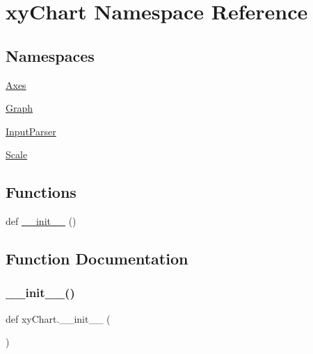 \hypertarget{namespacexy_chart}{}\section{xy\+Chart Namespace Reference}
\label{namespacexy_chart}
\subsection*{Namespaces}
\begin{DoxyCompactItemize}
\item 
 \hyperlink{namespacexy_chart_1_1_axes}{Axes}
\item 
 \hyperlink{namespacexy_chart_1_1_graph}{Graph}
\item 
 \hyperlink{namespacexy_chart_1_1_input_parser}{Input\+Parser}
\item 
 \hyperlink{namespacexy_chart_1_1_scale}{Scale}
\end{DoxyCompactItemize}
\subsection*{Functions}
\begin{DoxyCompactItemize}
\item 
def \hyperlink{namespacexy_chart_a0a9ad3e304e7b22163161e2895540585}{\+\_\+\+\_\+init\+\_\+\+\_\+} ()
\end{DoxyCompactItemize}


\subsection{Function Documentation}
\hypertarget{namespacexy_chart_a0a9ad3e304e7b22163161e2895540585}{}\label{namespacexy_chart_a0a9ad3e304e7b22163161e2895540585} 
\subsubsection{\texorpdfstring{\+\_\+\+\_\+init\+\_\+\+\_\+()}{\_\_init\_\_()}}
{\footnotesize\ttfamily def xy\+Chart.\+\_\+\+\_\+init\+\_\+\+\_\+ (\begin{DoxyParamCaption}{ }\end{DoxyParamCaption})}

